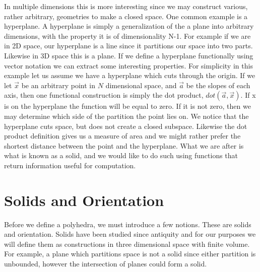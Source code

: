 In multiple dimensions this is more interesting since we may construct
various, rather arbitrary, geometries to make a closed space.
One common example is a hyperplane. A hyperplane is simply a generalization
of the a plane into arbitrary dimensions, with the property it is
of dimensionality N-1. For example if we are in 2D space, our hyperplane
is a line since it partitions our space into two parts. Likewise in 3D
space this is a plane. If we define a hyperplane functionally using vector
notation we can extract some interesting properties.
For simplicity in this example let us assume we have a hyperplane which
cuts through the origin.
If we let 
$\vec{x}$ be an arbitrary point in $N$ dimensional space,
and $\vec{a}$ be the slopes of each axis, then one functional construction is
simply the dot product, $dot(\vec{a},\vec{x})$. If x is on the hyperplane
the function will be equal to zero. If it is not zero,
then we may determine which side of the partition the point lies on.
We notice that the hyperplane cuts space, but does not create a closed
subspace. Likewise the dot product definition gives us a measure of
area and we might rather prefer the shortest distance between the point
and the hyperplane. What we are after is what is known as a solid, and
we would like to do such using functions that return information useful
for computation.

\section{Solids and Orientation}

Before we define a polyhedra, we must introduce a few notions. These are
solids and orientation. Solids have been studied since
antiquity and for our purposes we will define them as constructions in
three dimensional space with finite volume.
For example, a plane which partitions space is not a solid
since either partition is unbounded, however the intersection of planes
could form a solid.

